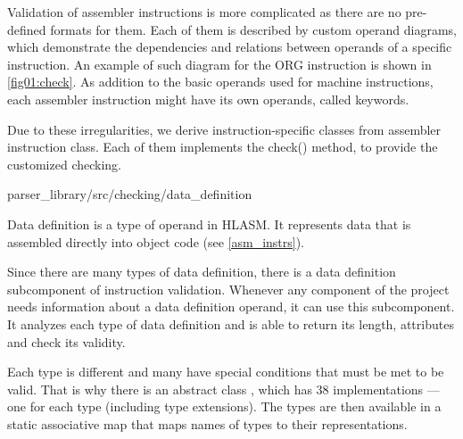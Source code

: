 Validation of assembler instructions is more complicated as there are no pre-defined formats for them. Each of them is described by custom operand diagrams, which demonstrate the dependencies and relations between operands of a specific instruction. An example of such diagram for the ORG instruction is shown in \cref{fig01:check}. As addition to the basic operands used for machine instructions, each assembler instruction might have its own operands, called keywords.

Due to these irregularities, we derive instruction-specific classes from assembler instruction class. Each of them implements the check() method, to provide the customized checking.

{parser\_library/src/checking/data\_definition}

Data definition is a type of operand in HLASM. It represents data that is assembled directly into object code (see \cref{asm_instrs}).

Since there are many types of data definition, there is a data definition subcomponent of instruction validation. Whenever any component of the project needs information about a data definition operand, it can use this subcomponent. It analyzes each type of data definition and is able to return its length, attributes and check its validity.

Each type is different and many have special conditions that must be met to be valid. That is why there is an abstract class , which has 38 implementations --- one for each type (including type extensions). The types are then available in a static associative map that maps names of types to their representations.

